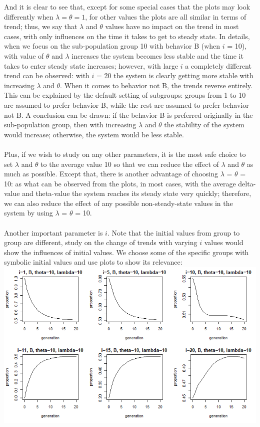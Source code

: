 \documentclass[a4paper,8pt]{extarticle}
\begin{document}
And it is clear to see that, except for some special cases that the plots may look differently when $\lambda = \theta = 1$,  for other values the plots are all similar in terms of trend; thus, we say that $\lambda$ and $\theta$ values have no impact on the trend in most cases, with only influences on the time it takes to get to steady state. In details, when we focus on the sub-population group 10 with behavior B (when $i$ = 10), with value of $\theta$ and $\lambda$ increases the system becomes less stable and the time it takes to enter steady state increases; however, with large $i$ a completely different trend  can be observed: with $i$ = 20 the system is clearly getting more stable with increasing $\lambda$ and $\theta$. When it comes to behavior not B, the trends reverse entirely. This can be explained by the default setting of subgroups: groups from 1 to 10 are assumed to prefer behavior B, while the rest are assumed to prefer behavior not B. A conclusion can be drawn: if the behavior B is preferred originally in the sub-population group, then with increasing $\lambda$ and $\theta$ the stability of the system would increase; otherwise, the system would be less stable.
\\
\\
Plus, if we wish to study on any other parameters, it is the most safe choice to set $\lambda$ and $\theta$ to the average value 10 so that we can reduce the effect of $\lambda$ and $\theta$ as much as possible. Except that, there is another advantage of choosing  $\lambda$ = $\theta$ = 10: as what can be observed from the plots, in most cases, with the average delta-value and theta-value the system reaches its steady state very quickly; therefore, we can also reduce the effect of any possible non-steady-state values in the system by using $\lambda$ = $\theta$ = 10.
\\
\\
Another important parameter is $i$. Note that the initial values from group to group are different,  study on the change of trends with varying $i$ values would show the influences of initial values. We choose some of the specific groups with symbolic initial values and use plots to show its relevance:
\\
\includegraphics[scale = 0.6]{00002f.png}
\end{document}
